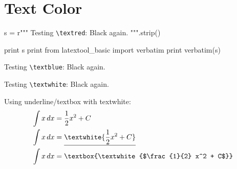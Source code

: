 \section{Text Color}

\begin{python}
s = r"""
Testing \verb!\textred!:
Black again.
""".strip()

print s
print
from latextool_basic import verbatim
print verbatim(s)
\end{python}

Testing \verb!\textblue!:
Black again.

Testing \verb!\textwhite!:
Black again.

Using underline/textbox with textwhite:
\begin{align*}
\int x \, dx &= \frac{1}{2} x^2 + C \\
\int x \, dx &= \underline{\textwhite{\frac{1}{2} x^2 + C}} \\
\int x \, dx &= \text{\textbox{\textwhite{$\frac{1}{2} x^2 + C$}}}
\end{align*}
